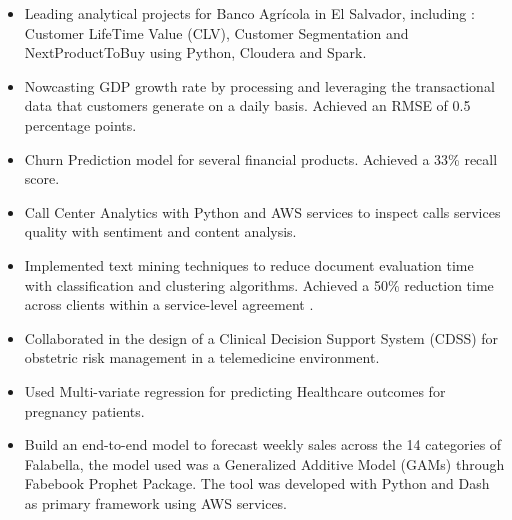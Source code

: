 \documentclass[10pt,a4paper,ragged2e]{altacv}
\begin{document}

\begin{itemize}
\item  Leading analytical projects for Banco Agrícola in El Salvador, including : Customer LifeTime Value (CLV),
Customer Segmentation and NextProductToBuy using Python,  Cloudera and Spark.
\item Nowcasting GDP growth rate by processing and leveraging the  transactional data that customers generate on a daily basis. Achieved an RMSE of 0.5 percentage points.
\item Churn Prediction model for several financial products. Achieved a 33\% recall score. 
\end{itemize}

\divider

\begin{itemize}
\item Call Center Analytics with Python and AWS services to inspect calls services quality with sentiment and content analysis.
\item Implemented text mining techniques to reduce document evaluation time with classification and clustering algorithms. Achieved a 50\% reduction time across clients within a service-level agreement .
\end{itemize}
\divider

\begin{itemize}
\item Collaborated in the design of a Clinical Decision Support System (CDSS) for obstetric risk management in a telemedicine environment.
\item Used Multi-variate regression for predicting Healthcare outcomes for pregnancy patients.
\end{itemize}
\divider


\begin{itemize}
\item  Build an end-to-end model to forecast weekly sales across the 14 categories of Falabella, the model used was a Generalized Additive Model (GAMs) through Fabebook Prophet Package. The tool was developed with Python and Dash as primary framework using AWS services.

\end{itemize}
\end{document}
